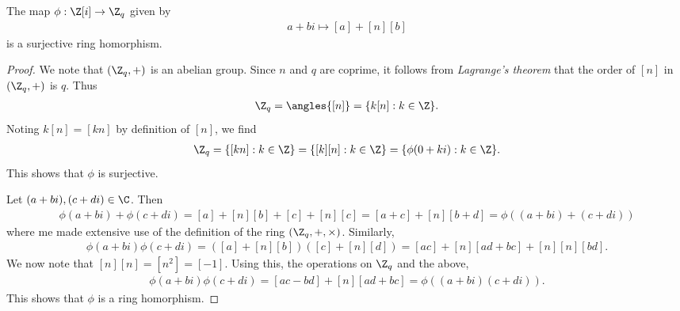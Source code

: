 \documentclass{article}
\begin{document}
\begin{claim*}[3]
	The map $\phi:\gaussint\to\Z_{q}$ given by
	\begin{align*}
		a + bi \mapsto [a]+[n][b]
	\end{align*}
	is a surjective ring homorphism.
	\begin{proof}
		We note that $(\Z_q,+)$ is an abelian group. Since $n$ and $q$ are coprime, it follows from
		\emph{Lagrange's theorem} that the order of $[n]$ in $(\Z_q,+)$ is $q$. Thus
		\begin{align*}
			\Z_q = \angles{[n]} = \{k[n] : k\in\Z\}.
		\end{align*}
		Noting $k[n]=[kn]$ by definition of $[n]$, we find
		\begin{align*}
			\Z_q = \{[kn] : k\in\Z\} = \{[k][n] : k\in\Z\} = \{\phi(0+ki):k\in\Z\}.
		\end{align*}
		This shows that $\phi$ is surjective.

		Let $(a+bi),(c+di)\in\C$. Then
		\begin{align*}
			\phi(a+bi) + \phi(c+di) = [a] + [n][b] + [c] + [n][c] = [a+c] + [n][b+d] = \phi((a+bi) + (c+di))
		\end{align*}
		where me made extensive use of the definition of the ring $(\Z_q,+,\times)$.
		Similarly,
		\begin{align*}
			\phi(a+bi)\phi(c+di)=([a]+[n][b])([c]+[n][d])=[ac]+[n][ad+bc]+[n][n][bd].
		\end{align*}
		We now note that $[n][n]=[n^2]=[-1]$. Using this, the operations on $\Z_q$ and the above,
		\begin{align*}
			\phi(a+bi)\phi(c+di)=[ac-bd]+[n][ad+bc]=\phi((a+bi)(c+di)).
		\end{align*}
		This shows that $\phi$ is a ring homorphism.
	\end{proof}
\end{claim*}
\end{document}
